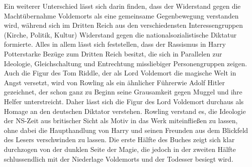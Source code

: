 Ein weiterer Unterschied lässt sich darin finden, dass der Widerstand gegen die Machtübernahme Voldemorts als eine gemeinsame Gegenbewegung verstanden wird, während sich im Dritten Reich aus den verschiedensten Interessengruppen (Kirche, Politik, Kultur) Widerstand gegen die nationalsozialistische Diktatur formierte.
Alles in allem lässt sich feststellen, dass der Rassismus in \glqq Harry Potter\grqq starke Bezüge zum Dritten Reich besitzt, die sich in Parallelen zur Ideologie, Gleichschaltung und Entrechtung missliebiger Personengruppen zeigen. Auch die Figur des Tom Riddle, der als Lord Voldemort die magische Welt in Angst versetzt, wird von Rowling als ein ähnlicher \glqq Führer\grqq wie Adolf Hitler gezeichnet, der schon ganz zu Beginn seine Grausamkeit gegen Muggel und ihre Helfer unterstreicht. Daher lässt sich die Figur des Lord Voldemort durchaus als Homage an den deutschen Diktator verstehen. Rowling verstand es, die Ideologie der NS-Zeit aus britischer Sicht als Motiv in das Werk miteinfließen zu lassen, ohne dabei die Haupthandlung von Harry und seinen Freunden aus dem Blickfeld des Lesers verschwinden zu lassen. Die erste Hälfte des Buches zeigt sich klar durchzogen von der dunklen Seite der Magie, die jedoch in der zweiten Hälfte schlussendlich mit der Niederlage Voldemorts und der Todesser besiegt wird.
